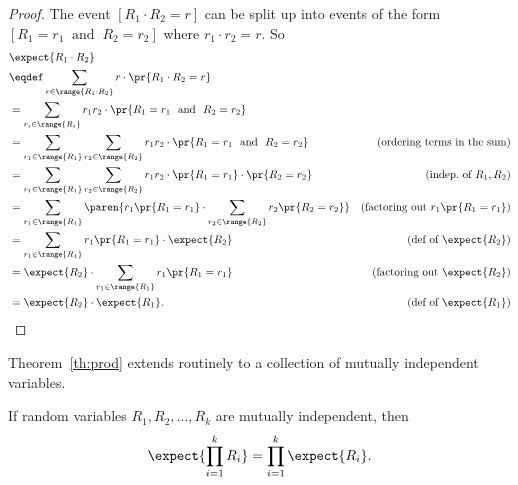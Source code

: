 \begin{proof}
The event $[R_1 \cdot R_2=r]$ can be split up into events of the form
$[R_1 = r_1\ \text{ and }\ R_2 = r_2]$ where $r_1\cdot r_2=r$.  So
\begin{align*}
\lefteqn{\expect{R_1 \cdot R_2}}\\
& \eqdef \sum_{r \in \range{R_1\cdot R_2}} r\cdot \pr{R_1\cdot R_2=r}\\
\iffalse
& =      \sum_{\scriptsize \begin{aligned}
                       r_1 \in \range{R_1},\\
                       r_2 \in \range{R_2}
                      \end{aligned}}\fi
& =      \sum_{r_i \in \range{R_i}}
            r_1 r_2 \cdot \pr{R_1=r_1\ \text{ and }\ R_2=r_2}\\
& =      \sum_{r_1 \in \range{R_1}} \sum_{r_2 \in \range{R_2}}
            r_1 r_2 \cdot \pr{R_1=r_1\ \text{ and }\ R_2=r_2}
                    &\text{(ordering terms in the sum)}\\
& =      \sum_{r_1 \in \range{R_1}} \sum_{r_2 \in \range{R_2}}
            r_1 r_2 \cdot \pr{R_1=r_1}\cdot \pr{R_2=r_2}
                    &\text{(indep.\ of $R_1,R_2$)}\\
& =      \sum_{r_1 \in \range{R_1}} \paren{r_1\pr{R_1=r_1} \cdot
              \sum_{r_2 \in \range{R_2}} r_2 \pr{R_2=r_2}}
                    &\text{(factoring out $r_1\pr{R_1=r_1}$)}\\
& =      \sum_{r_1 \in \range{R_1}} r_1\pr{R_1=r_1} \cdot \expect{R_2}
                    &\text{(def of $\expect{R_2}$)}\\
& =       \expect{R_2} \cdot \sum_{r_1 \in \range{R_1}} r_1\pr{R_1=r_1}
                    &\text{(factoring out $\expect{R_2}$)}\\
& =       \expect{R_2} \cdot  \expect{R_1}.
                    &\text{(def of $\expect{R_1}$)}
\end{align*}

\end{proof}

Theorem~\ref{th:prod} extends routinely to a collection of mutually
independent variables.
\begin{corollary}
If random variables $R_1, R_2, \dots, R_k$ are mutually
independent, then
\[
\expect{\prod_{i=1}^k R_i} = \prod_{i=1}^k \expect{R_i}.
\]
\end{corollary}




\endinput
